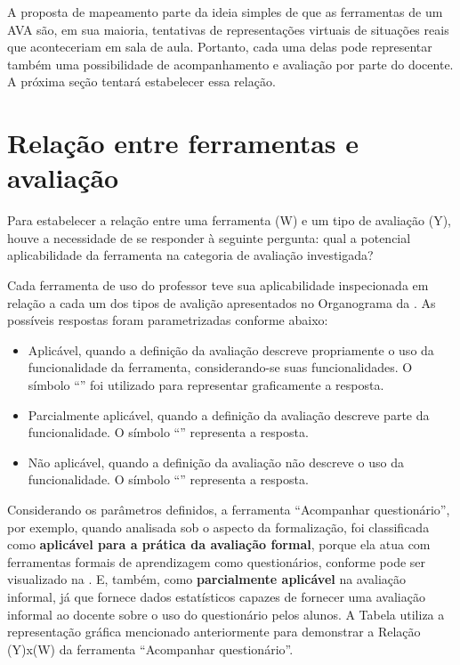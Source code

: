 A proposta de mapeamento parte da ideia simples de que as ferramentas de um AVA são, em sua maioria, tentativas de representações virtuais de situações reais que aconteceriam em sala de aula. Portanto, cada uma delas pode representar também uma possibilidade de acompanhamento e avaliação por parte do docente. A próxima seção tentará estabelecer essa relação.  

\section{Relação entre ferramentas e avaliação}

Para estabelecer a relação entre uma ferramenta (W) e um tipo de avaliação (Y), houve a necessidade de se responder à seguinte pergunta: qual a potencial aplicabilidade da ferramenta na categoria de avaliação investigada?

Cada ferramenta de uso do professor teve sua aplicabilidade inspecionada em relação a cada um dos tipos de avalição apresentados no Organograma da . As possíveis respostas foram parametrizadas conforme abaixo:

\begin{itemize}
    \item Aplicável, quando a definição da avaliação descreve propriamente o uso da funcionalidade da ferramenta, considerando-se suas funcionalidades. O símbolo ``'' foi utilizado para representar graficamente a resposta.
    \item Parcialmente aplicável, quando a definição da avaliação descreve parte da funcionalidade. O símbolo ``'' representa a resposta. \item Não aplicável, quando a definição da avaliação não descreve o uso da funcionalidade. O símbolo ``'' representa a resposta. 
\end{itemize}

Considerando os parâmetros definidos, a ferramenta ``Acompanhar questionário'', por exemplo, quando analisada sob o aspecto da formalização, foi classificada como \textbf{aplicável para a prática da avaliação formal}, porque ela atua com ferramentas formais de aprendizagem como questionários, conforme pode ser visualizado na . E, também, como \textbf{parcialmente aplicável} na avaliação informal, já que fornece dados estatísticos capazes de fornecer uma avaliação informal ao docente sobre o uso do questionário pelos alunos. A Tabela  utiliza a representação gráfica mencionado anteriormente para demonstrar a Relação (Y)x(W) da ferramenta ``Acompanhar questionário''.

